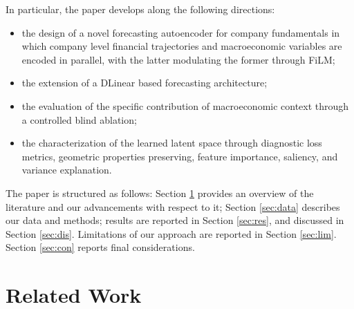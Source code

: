 \documentclass[a4paper,fleqn]{cas-dc}
\newcommand{\angela}[1]{{\color{magenta}{\textbf{Angela}: #1}}}
\begin{document}
In particular, the paper develops along the following directions:


\begin{itemize}
\item the design of a novel forecasting autoencoder for company fundamentals in which company level financial trajectories and macroeconomic variables are encoded in parallel, with the latter modulating the former through FiLM; 
\item the extension of a DLinear based forecasting architecture;
\item the evaluation of the specific contribution of macroeconomic context through a controlled blind ablation;
\item the characterization of the learned latent space through diagnostic loss metrics, geometric properties preserving, feature importance, saliency, and variance explanation.
\end{itemize}

The paper is structured as follows: Section \ref{sec:rw} provides an overview of the literature and our advancements with respect to it; Section \ref{sec:data} describes our data and methods; results are reported in Section \ref{sec:res}, and discussed in Section \ref{sec:dis}. Limitations of our approach are reported in Section \ref{sec:lim}. Section \ref{sec:con} reports final considerations.


\section{Related Work} \label{sec:rw}
\end{document}
